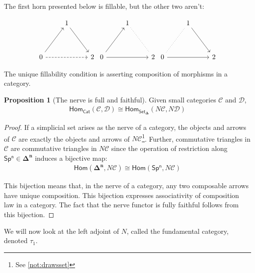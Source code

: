 \documentclass[10pt]{amsart}
\newcommand{\8}{\ensuremath{\infty}}
\newcommand{\0}{\ensuremath{\overset{\rightarrow}{0}}}
\newcommand{\1}{\ensuremath{\mathbf{1}}}
\newcommand{\C}{\ensuremath{\mathscr{C}}}
\newcommand{\D}{\ensuremath{\mathscr{D}}}
\newcommand{\Cat}{\ensuremath{\mathsf{Cat}}}
\newcommand{\Hom}{\ensuremath{\mathsf{Hom}}}
\newcommand{\Simplex}[1]{\ensuremath{\boldsymbol{\Delta^{#1}}}}
\newcommand{\SSet}{\ensuremath{\mathsf{Set}_{\boldsymbol{\Delta}}}}
\newcommand{\Sp}[1]{\ensuremath{\mathsf{Sp^{#1}}}}
\theoremstyle{definition}
\newtheorem{proposition}[definition]{Proposition}
\numberwithin{definition}{subsection}
\numberwithin{definition}{section}
\begin{document}
The first horn presented below is fillable, but the other two aren't:

\begin{equation*}
  \begin{tikzcd}
    & 1 \arrow[ddr] & \\
    \\
    0 \arrow[uur] \arrow[rr, dashed] & & 2
  \end{tikzcd}
  \begin{tikzcd}
    & 1 \arrow[ddr, dash, dotted] & \\
    \\
    0 \arrow[uur] \arrow[rr] & & 2
  \end{tikzcd}
  \begin{tikzcd}
    & 1 \arrow[ddr] & \\
    \\
    0 \arrow[uur, dash, dotted] \arrow[rr] & & 2
  \end{tikzcd}
\end{equation*}

The unique fillability condition is asserting composition of morphisms in a category.

\begin{proposition}[The nerve is full and faithful]
  Given small categories $\C$ and $\D$,
  \begin{align*}
    \Hom_\Cat(\C, \D) \cong \Hom_{\SSet}(N\C, N\D)
  \end{align*}
\end{proposition}

\begin{proof}
  If a simplicial set arises as the nerve of a category, the objects and arrows of $\C$ are exactly the objects and arrows of $N\C$\footnote{See \ref{not:drawsset}}. Further, commutative triangles in $\C$ are commutative triangles in $N\C$ since the operation of restriction along $\Sp{n} \in \Simplex{n}$ induces a bijective map:
  \begin{align*}
    \Hom(\Simplex{n}, N\C) \cong \Hom(\Sp{n}, N\C)
  \end{align*}

  This bijection means that, in the nerve of a category, any two composable arrows have unique composition. This bijection expresses associativity of composition law in a category. The fact that the nerve functor is fully faithful follows from this bijection.
\end{proof}

We will now look at the left adjoint of $N$, called the fundamental category, denoted $\tau_1$.
\end{document}
